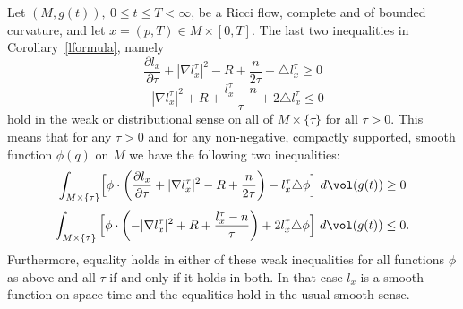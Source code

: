 \begin{theorem}
\label{thm:l-weak-inequalities}
\label{weak}
Let $(M,g(t)),\ 0\le t\le T<\infty$, be a Ricci flow, complete and
of bounded curvature, and let $x=(p,T)\in M\times[0,T]$. The last
two inequalities in Corollary~\ref{lformula}, namely
$$\frac{\partial l_x}{\partial \tau}+|\nabla l^\tau_x|^2-R+\frac{n}{2\tau}
- \triangle l^\tau_x\ge 0$$
$$-|\nabla l^\tau_x|^2+R+\frac{l^\tau_x-n}{\tau}+2\triangle l^\tau_x\le 0$$
hold in the weak or distributional sense on all of $M\times\{\tau\}$
for all $\tau>0$. This means that for any $\tau>0$ and for any
non-negative, compactly supported, smooth function $\phi(q)$ on $M$
we have the following two inequalities:
$$\int_{M\times \{\tau\}}\Bigl[ \phi\cdot\left(\frac{\partial l_x}{\partial \tau}+|\nabla
l_x^\tau|^2-R+\frac{n}{2\tau}\right) - l_x^\tau\triangle \phi\Bigr]\
d\vol(g(t))\ge 0$$
$$\int_{M\times \{\tau\}}\Big[ \phi\cdot\left(-|\nabla
l_x^\tau|^2+R+\frac{l_x^\tau-n}{\tau}\right)+2l^\tau_x\triangle
\phi\Bigr]\ d\vol(g(t))\le 0.$$ Furthermore, equality holds in
either of these weak inequalities for all functions $\phi$ as above
and all $\tau$ if and only if it holds in both. In that case $l_x$
is a smooth function on space-time and the equalities hold in the
usual smooth sense.
\end{theorem}







